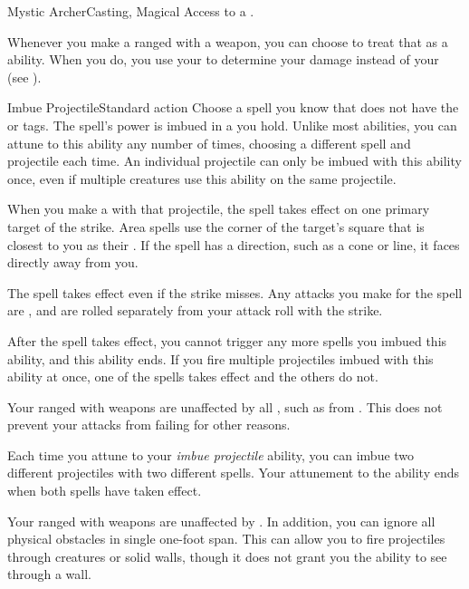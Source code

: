   \begin{magicalfeat}{Mystic Archer}{Casting, Magical}
    \featpre Access to a .

     Whenever you make a ranged  with a  weapon, you can choose to treat that as a \magical ability.
    When you do, you use your  to determine your damage instead of your  (see ).

    \begin{magicalattuneability}{Imbue Projectile}{Standard action}
      \abilitytags {}
      \rankline
      Choose a spell you know that does not have the  or  tags.
      The spell's power is imbued in a  you hold.
      Unlike most  abilities, you can attune to this ability any number of times, choosing a different spell and projectile each time.
      An individual projectile can only be imbued with this ability once, even if multiple creatures use this ability on the same projectile.

      When you make a  with that projectile, the spell takes effect on one primary target of the strike.
      Area spells use the corner of the target's square that is closest to you as their .
      If the spell has a direction, such as a cone or line, it faces directly away from you.

      The spell takes effect even if the strike misses.
      Any attacks you make for the spell are , and are rolled separately from your attack roll with the strike.

      After the spell takes effect, you  cannot trigger any more spells you imbued this ability, and this ability ends.
      If you fire multiple projectiles imbued with this ability at once, one of the spells takes effect and the others do not.
    \end{magicalattuneability}

     Your ranged  with  weapons are unaffected by all , such as from .
    This does not prevent your attacks from failing for other reasons.

     Each time you attune to your \textit{imbue projectile} ability, you can imbue two different projectiles with two different spells.
    Your attunement to the ability ends when both spells have taken effect.

     Your ranged  with  weapons are unaffected by .
    In addition, you can ignore all physical obstacles in single one-foot span.
    This can allow you to fire projectiles through creatures or solid walls, though it does not grant you the ability to see through a wall.
  \end{magicalfeat}

